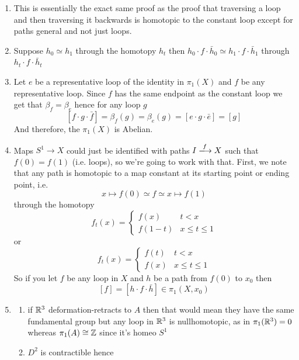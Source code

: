 \documentclass{pset}
\begin{document}
\begin{problem}
    \begin{enumerate}[label=1.1.\arabic*]
        \item This is essentially the exact same proof as the proof that traversing a loop and then traversing it backwards is homotopic to the constant loop except for paths general and not just loops.
        \item Suppose $h_0\simeq h_1$ through the homotopy $h_t$ then $h_0\cdot f\cdot\bar{h}_0\simeq h_1 \cdot f \cdot \bar{h}_1$ through $h_t \cdot f \cdot \bar{h}_t$
        \item Let $e$ be a representative loop of the identity in $\pi_1(X)$ and $f$ be any representative loop. Since $f$ has the same endpoint as the constant loop we get that $\beta_f = \beta_e$ hence for any loop $g$
        \[[f \cdot g \cdot \bar{f}] = \beta_f(g) = \beta_e(g) = [e \cdot g \cdot \bar{e}] = [g]\]
        And therefore, the $\pi_1(X)$ is Abelian.
        \setcounter{enumi}{5}
        \item Maps $S^1 \to X$ could just be identified with paths $I \xlongrightarrow{f} X$ such that $f(0) = f(1)$ (i.e. loops), so we're going to work with that. First, we note that any path is homotopic to a map constant at its starting point or ending point, i.e.
        \[x \mapsto f(0) \simeq f \simeq x \mapsto f(1)\]
        through the homotopy
        \[f_t(x) =
        \begin{cases}
            f(x) & t<x \\
            f(1-t) & x \leq t \leq 1
        \end{cases}
        \]
        or 
        \[f_t(x) =
        \begin{cases}
            f(t) & t<x \\
            f(x) & x \leq t \leq 1
        \end{cases}
        \]
        So if you let $f$ be any loop in $X$ and $h$ be a path from $f(0)$ to $x_0$ then
        \[[f] = [h \cdot f \cdot \bar{h}] \in \pi_1(X, x_0)\] 
        \setcounter{enumi}{15}
        \item 
        \begin{enumerate}
            \item if $\mathbb{R}^3$ deformation-retracts to $A$ then that would mean they have the same fundamental group but any loop in $\mathbb{R}^3$ is nullhomotopic, as in $\pi_1(\mathbb{R}^3) = 0$ whereas $\pi_1(A) \cong \mathbb{Z}$ since it's homeo $S^1$
            \item $D^2$ is contractible hence

\end{enumerate}
\end{enumerate}
\end{problem}
\end{document}
